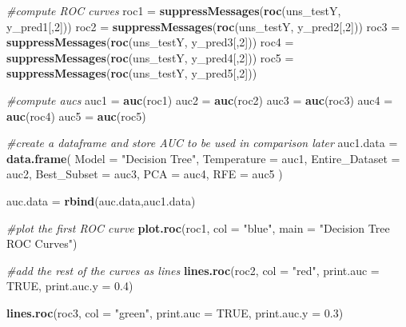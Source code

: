 \documentclass[
]{article}
\newenvironment{Shaded}{\begin{snugshade}}{\end{snugshade}}
\newcommand{\AttributeTok}[1]{\textcolor[rgb]{0.13,0.29,0.53}{#1}}
\newcommand{\CommentTok}[1]{\textcolor[rgb]{0.56,0.35,0.01}{\textit{#1}}}
\newcommand{\ConstantTok}[1]{\textcolor[rgb]{0.56,0.35,0.01}{#1}}
\newcommand{\DecValTok}[1]{\textcolor[rgb]{0.00,0.00,0.81}{#1}}
\newcommand{\FloatTok}[1]{\textcolor[rgb]{0.00,0.00,0.81}{#1}}
\newcommand{\FunctionTok}[1]{\textcolor[rgb]{0.13,0.29,0.53}{\textbf{#1}}}
\newcommand{\NormalTok}[1]{#1}
\newcommand{\OtherTok}[1]{\textcolor[rgb]{0.56,0.35,0.01}{#1}}
\newcommand{\StringTok}[1]{\textcolor[rgb]{0.31,0.60,0.02}{#1}}
\begin{document}
\begin{Shaded}
\begin{Highlighting}[]
\CommentTok{\#compute ROC curves}
\NormalTok{roc1 }\OtherTok{=} \FunctionTok{suppressMessages}\NormalTok{(}\FunctionTok{roc}\NormalTok{(uns\_testY, y\_pred1[,}\DecValTok{2}\NormalTok{]))}
\NormalTok{roc2 }\OtherTok{=} \FunctionTok{suppressMessages}\NormalTok{(}\FunctionTok{roc}\NormalTok{(uns\_testY, y\_pred2[,}\DecValTok{2}\NormalTok{]))}
\NormalTok{roc3 }\OtherTok{=} \FunctionTok{suppressMessages}\NormalTok{(}\FunctionTok{roc}\NormalTok{(uns\_testY, y\_pred3[,}\DecValTok{2}\NormalTok{]))}
\NormalTok{roc4 }\OtherTok{=} \FunctionTok{suppressMessages}\NormalTok{(}\FunctionTok{roc}\NormalTok{(uns\_testY, y\_pred4[,}\DecValTok{2}\NormalTok{]))}
\NormalTok{roc5 }\OtherTok{=} \FunctionTok{suppressMessages}\NormalTok{(}\FunctionTok{roc}\NormalTok{(uns\_testY, y\_pred5[,}\DecValTok{2}\NormalTok{]))}

\CommentTok{\#compute aucs}
\NormalTok{auc1 }\OtherTok{=} \FunctionTok{auc}\NormalTok{(roc1)}
\NormalTok{auc2 }\OtherTok{=} \FunctionTok{auc}\NormalTok{(roc2)}
\NormalTok{auc3 }\OtherTok{=} \FunctionTok{auc}\NormalTok{(roc3)}
\NormalTok{auc4 }\OtherTok{=} \FunctionTok{auc}\NormalTok{(roc4)}
\NormalTok{auc5 }\OtherTok{=} \FunctionTok{auc}\NormalTok{(roc5)}

\CommentTok{\#create a dataframe and store AUC to be used in comparison later}
\NormalTok{auc1.data }\OtherTok{=} \FunctionTok{data.frame}\NormalTok{(}
  \AttributeTok{Model =} \StringTok{"Decision Tree"}\NormalTok{,}
  \AttributeTok{Temperature =}\NormalTok{ auc1,}
  \AttributeTok{Entire\_Dataset =}\NormalTok{ auc2,}
  \AttributeTok{Best\_Subset =}\NormalTok{ auc3,}
  \AttributeTok{PCA =}\NormalTok{ auc4,}
  \AttributeTok{RFE =}\NormalTok{ auc5}
\NormalTok{)}

\NormalTok{auc.data }\OtherTok{=} \FunctionTok{rbind}\NormalTok{(auc.data,auc1.data)}

\CommentTok{\#plot the first ROC curve}
\FunctionTok{plot.roc}\NormalTok{(roc1, }\AttributeTok{col =} \StringTok{"blue"}\NormalTok{, }\AttributeTok{main =} \StringTok{"Decision Tree ROC Curves"}\NormalTok{)}

\CommentTok{\#add the rest of the curves as lines}
\FunctionTok{lines.roc}\NormalTok{(roc2, }\AttributeTok{col =} \StringTok{"red"}\NormalTok{, }\AttributeTok{print.auc =} \ConstantTok{TRUE}\NormalTok{, }\AttributeTok{print.auc.y =} \FloatTok{0.4}\NormalTok{)}

\FunctionTok{lines.roc}\NormalTok{(roc3, }\AttributeTok{col =} \StringTok{"green"}\NormalTok{, }\AttributeTok{print.auc =} \ConstantTok{TRUE}\NormalTok{, }\AttributeTok{print.auc.y =} \FloatTok{0.3}\NormalTok{)}


\end{Highlighting}
\end{Shaded}
\end{document}
